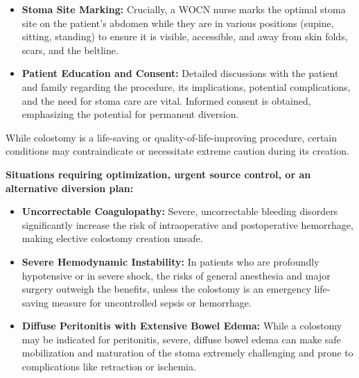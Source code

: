 \begin{itemize}
  \item \textbf{Stoma Site Marking:} Crucially, a WOCN nurse marks the optimal stoma site on the patient's abdomen while they are in various positions (supine, sitting, standing) to ensure it is visible, accessible, and away from skin folds, scars, and the beltline.
  
  \item \textbf{Patient Education and Consent:} Detailed discussions with the patient and family regarding the procedure, its implications, potential complications, and the need for stoma care are vital. Informed consent is obtained, emphasizing the potential for permanent diversion.
\end{itemize}

While colostomy is a life-saving or quality-of-life-improving procedure, certain conditions may contraindicate or necessitate extreme caution during its creation.

\textbf{Situations requiring optimization, urgent source control, or an alternative diversion plan:}
\begin{itemize}
  \item \textbf{Uncorrectable Coagulopathy:} Severe, uncorrectable bleeding disorders significantly increase the risk of intraoperative and postoperative hemorrhage, making elective colostomy creation unsafe.
  
  \item \textbf{Severe Hemodynamic Instability:} In patients who are profoundly hypotensive or in severe shock, the risks of general anesthesia and major surgery outweigh the benefits, unless the colostomy is an emergency life-saving measure for uncontrolled sepsis or hemorrhage.
  
  \item \textbf{Diffuse Peritonitis with Extensive Bowel Edema:} While a colostomy may be indicated for peritonitis, severe, diffuse bowel edema can make safe mobilization and maturation of the stoma extremely challenging and prone to complications like retraction or ischemia.
\end{itemize}

